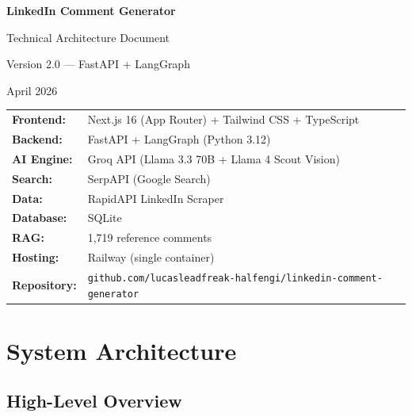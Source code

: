 \documentclass[12pt,a4paper]{article}
\begin{document}
\begin{titlepage}
\centering
\vspace*{2cm}
{\Huge\bfseries\color{primary} LinkedIn Comment Generator\par}
\vspace{0.5cm}
{\Large\color{darktext} Technical Architecture Document\par}
\vspace{1cm}
{\large Version 2.0 --- FastAPI + LangGraph\par}
\vspace{0.5cm}
{\large April 2026\par}
\vspace{2cm}

\begin{tcolorbox}[colback=blue!3,colframe=primary,width=0.85\textwidth]
\small
\begin{tabular}{ll}
\textbf{Frontend:} & Next.js 16 (App Router) + Tailwind CSS + TypeScript \\
\textbf{Backend:} & FastAPI + LangGraph (Python 3.12) \\
\textbf{AI Engine:} & Groq API (Llama 3.3 70B + Llama 4 Scout Vision) \\
\textbf{Search:} & SerpAPI (Google Search) \\
\textbf{Data:} & RapidAPI LinkedIn Scraper \\
\textbf{Database:} & SQLite \\
\textbf{RAG:} & 1,719 reference comments \\
\textbf{Hosting:} & Railway (single container) \\
\textbf{Repository:} & \texttt{github.com/lucasleadfreak-halfengi/linkedin-comment-generator} \\
\end{tabular}
\end{tcolorbox}

\vfill
\end{titlepage}

\tableofcontents
\newpage

\section{System Architecture}

\subsection{High-Level Overview}
\end{document}
